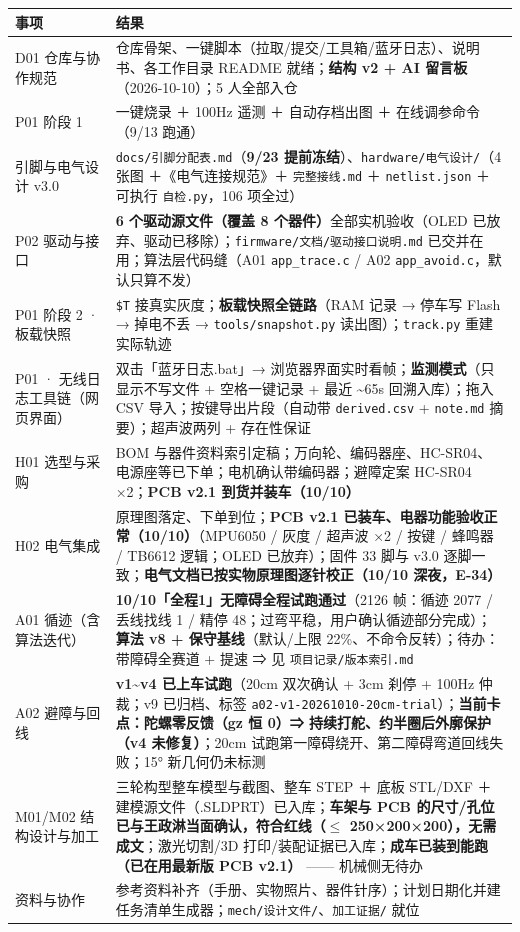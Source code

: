 \documentclass[10.5pt]{article}
\newcommand{\sect}[1]{\par\vspace{9pt}{\large\bfseries\color{accent}#1}\par\vspace{3pt}}
\begin{document}
\sect{8. 已完成（截至 10/12）}
{\small
\begin{tabular}{@{}L{3.6cm}L{14.2cm}@{}}
\toprule
\textbf{事项} & \textbf{结果}\tabularnewline
\midrule
D01 仓库与协作规范 & 仓库骨架、一键脚本（拉取/提交/工具箱/蓝牙日志）、说明书、各工作目录 README 就绪；\textbf{结构 v2 + AI 留言板}（2026-10-10）；5 人全部入仓\tabularnewline
P01 阶段 1 & 一键烧录 ＋ 100Hz 遥测 ＋ 自动存档出图 ＋ 在线调参命令（9/13 跑通）\tabularnewline
引脚与电气设计 v3.0 & \texttt{docs/引脚分配表.md}（\textbf{9/23 提前冻结}）、\texttt{hardware/电气设计/}（4 张图 ＋《电气连接规范》＋ \texttt{完整接线.md} ＋ \texttt{netlist.json} ＋ 可执行 \texttt{自检.py}，106 项全过）\tabularnewline
P02 驱动与接口 & \textbf{6 个驱动源文件（覆盖 8 个器件）}全部实机验收（OLED 已放弃、驱动已移除）；\texttt{firmware/文档/驱动接口说明.md} 已交并在用；算法层代码缝（A01 \texttt{app\_trace.c} / A02 \texttt{app\_avoid.c}，默认只算不发）\tabularnewline
P01 阶段 2 · 板载快照 & \texttt{\$T} 接真实灰度；\textbf{板载快照全链路}（RAM 记录 → 停车写 Flash → 掉电不丢 → \texttt{tools/snapshot.py} 读出图）；\texttt{track.py} 重建实际轨迹\tabularnewline
P01 · 无线日志工具链（网页界面） & 双击「蓝牙日志.bat」→ 浏览器界面实时看帧；\textbf{监测模式}（只显示不写文件 + 空格一键记录 + 最近 \textasciitilde{}65s 回溯入库）；拖入 CSV 导入；按键导出片段（自动带 \texttt{derived.csv} + \texttt{note.md} 摘要）；超声波两列 + 存在性保证\tabularnewline
H01 选型与采购 & BOM 与器件资料索引定稿；万向轮、编码器座、HC-SR04、电源座等已下单；电机确认带编码器；避障定案 HC-SR04 ×2；\textbf{PCB v2.1 到货并装车（10/10）}\tabularnewline
H02 电气集成 & 原理图落定、下单到位；\textbf{PCB v2.1 已装车、电器功能验收正常（10/10）}（MPU6050 / 灰度 / 超声波 ×2 / 按键 / 蜂鸣器 / TB6612 逻辑；OLED 已放弃）；固件 33 脚与 v3.0 逐脚一致；\textbf{电气文档已按实物原理图逐针校正（10/10 深夜，E-34）}\tabularnewline
A01 循迹（含算法迭代） & \textbf{10/10「全程1」无障碍全程试跑通过}（2126 帧：循迹 2077 / 丢线找线 1 / 精停 48；过弯平稳，用户确认循迹部分完成）；\textbf{算法 v8 + 保守基线}（默认/上限 22\%、不命令反转）；待办：带障碍全赛道 + 提速 ⇒ 见 \texttt{项目记录/版本索引.md}\tabularnewline
A02 避障与回线 & \textbf{v1\textasciitilde{}v4 已上车试跑}（20cm 双次确认 + 3cm 刹停 + 100Hz 仲裁；v9 已归档、标签 \texttt{a02-v1-20261010-20cm-trial}）；\textbf{当前卡点：陀螺零反馈（gz 恒 0）⇒ 持续打舵、约半圈后外廓保护（v4 未修复）}；20cm 试跑第一障碍绕开、第二障碍弯道回线失败；15° 新几何仍未标测\tabularnewline
M01/M02 结构设计与加工 & 三轮构型整车模型与截图、整车 STEP ＋ 底板 STL/DXF ＋ 建模源文件（.SLDPRT）已入库；\textbf{车架与 PCB 的尺寸/孔位已与王政淋当面确认，符合红线（$\leq$ 250×200×200），无需成文}；激光切割/3D 打印/装配证据已入库；\textbf{成车已装到能跑（已在用最新版 PCB v2.1）} —— 机械侧无待办\tabularnewline
资料与协作 & 参考资料补齐（手册、实物照片、器件针序）；计划日期化并建任务清单生成器；\texttt{mech/设计文件/}、\texttt{加工证据/} 就位\tabularnewline
\bottomrule
\end{tabular}

}
\end{document}
